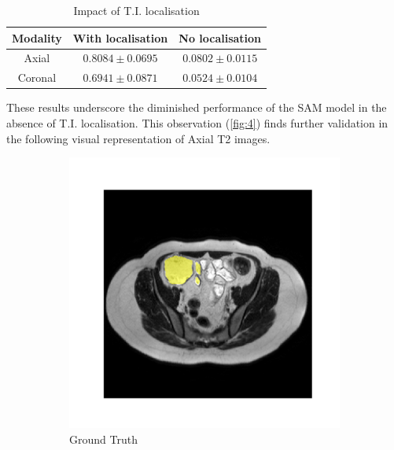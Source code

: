 \begin{table}[ht]
\centering
\begin{tabular}{c|c|c}
Modality & With localisation & No localisation \\
\hline
Axial & \(0.8084 \pm 0.0695\) & \(0.0802 \pm 0.0115\)\\
\hline
Coronal & \(0.6941 \pm 0.0871\) & \(0.0524 \pm 0.0104\)
\end{tabular}
\caption{Impact of T.I. localisation}
\label{tab:ablation-ti}
\end{table}

These results underscore the diminished performance of the SAM model in the absence of T.I. localisation. This observation (\autoref{fig:4}) finds further validation in the following visual representation of Axial T2 images.

\begin{figure}[htp]
\centering
\begin{subfigure}[b]{0.47\textwidth}
\centering
\includegraphics[width=\textwidth]{./figures/ablation_gt.png}
\caption{Ground Truth}
\label{fig:1}
\end{subfigure}
\hfill
\begin{subfigure}[b]{0.47\textwidth}
\centering

\end{subfigure}
\end{figure}
